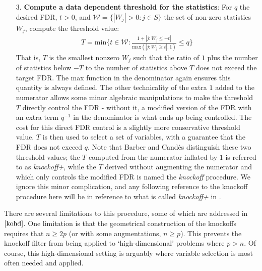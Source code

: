 \documentclass[]{scrartcl}
\newcommand{\1}[1]{\mathbbm{1}_{\left\{#1\right\}}}
\begin{document}
\begin{itemize}
	\item[3.]\textbf{Compute a data dependent threshold for the statistics}: For $q$ the desired FDR, $t > 0$, and $\mathcal{W} = \{|W_{j}| > 0: j \in S \}$ the set of non-zero statistics $W_{j}$, compute the threshold value:
	\begin{align*}
		T = \text{min}\Big\{t \in \mathcal{W}: \frac{1 + |j: W_{j} \leq -t|}{\text{max}(|j: W_{j} \geq t|, 1)} \leq q \Big\}
	\end{align*}
	That is, $T$ is the smallest nonzero $W_{j}$ such that the ratio of $1$ plus the number of statistics below $-T$ to the number of statistics above $T$ does not exceed the target FDR. The max function in the denominator again ensures this quantity is always defined. The other technicality of the extra $1$ added to the numerator allows some minor algebraic manipulations to make the threshold $T$ directly control the FDR - without it, a modified version of the FDR with an extra term $q^{-1}$ in the denominator is what ends up being controlled. The cost for this direct FDR control is a slightly more conservative threshold value. $T$ is then used to select a set of variables, with a guarantee that the FDR does not exceed $q$. Note that Barber and Cand\`es distinguish these two threshold values; the $T$ computed from the numerator inflated by $1$ is referred to as \textit{knockoff+}, while the $T$ derived without augmenting the numerator and which only controls the modified FDR is named the \textit{knockoff} procedure. We ignore this minor complication, and any following reference to the knockoff procedure here will be in reference to what is called \textit{knockoff+} in \cite{ko}.
\end{itemize}
There are several limitations to this procedure, some of which are addressed in $\cite{kohd}$. One limitation is that the geometrical construction of the knockoffs requires that $n \geq 2p$ (or with some augmentations, $n \geq p$). This prevents the knockoff filter from being applied to `high-dimensional' problems where $p > n$. Of course, this high-dimensional setting is arguably where variable selection is most often needed and applied. 
\end{document}
